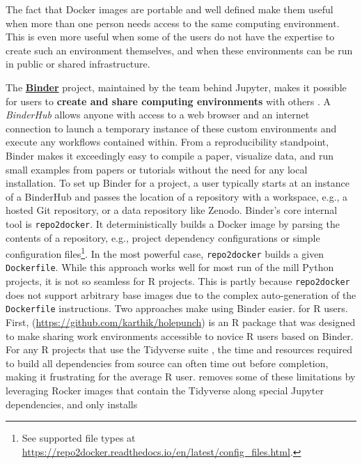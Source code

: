 \label{workenvs}

The fact that Docker images are portable and well defined make them
useful when more than one person needs access to the same computing
environment. This is even more useful when some of the users do not have
the expertise to create such an environment themselves, and when these
environments can be run in public or shared infrastructure.

The \href{https://mybinder.readthedocs.io/en/latest/}{\textbf{Binder}}
project, maintained by the team behind Jupyter, makes it possible for
users to \textbf{create and share computing environments} with others
\citep{jupyter_binder_2018}. A \emph{BinderHub} allows anyone with
access to a web browser and an internet connection to launch a temporary
instance of these custom environments and execute any workflows
contained within. From a reproducibility standpoint, Binder makes it
exceedingly easy to compile a paper, visualize data, and run small
examples from papers or tutorials without the need for any local
installation. To set up Binder for a project, a user typically starts at
an instance of a BinderHub and passes the location of a repository with
a workspace, e.g., a hosted Git repository, or a data repository like
Zenodo. Binder's core internal tool is \texttt{repo2docker}. It
deterministically builds a Docker image by parsing the contents of a
repository, e.g., project dependency configurations or simple
configuration
files\footnote{See supported file types at \href{https://repo2docker.readthedocs.io/en/latest/config\_files.html}{https://repo2docker.readthedocs.io/en/latest/config\_files.html}.}.
In the most powerful case, \texttt{repo2docker} builds a given
\texttt{Dockerfile}. While this approach works well for most run of the
mill Python projects, it is not so seamless for R projects. This is
partly because \texttt{repo2docker} does not support arbitrary base
images due to the complex auto-generation of the \texttt{Dockerfile}
instructions. Two approaches make using Binder easier. for R users.
First, \textbf{}
(\url{https://github.com/karthik/holepunch}) is an R package that was
designed to make sharing work environments accessible to novice R users
based on Binder. For any R projects that use the Tidyverse suite
\citep{wickham_welcome_2019}, the time and resources required to build
all dependencies from source can often time out before completion,
making it frustrating for the average R user.  removes
some of these limitations by leveraging Rocker images that contain the
Tidyverse along special Jupyter dependencies, and only installs
